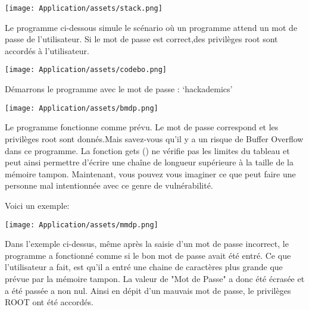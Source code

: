 \begin{center}
\vspace{0.5cm}
\texttt{[image: Application/assets/stack.png]}
\vspace{0.5cm}
\end{center}

Le programme ci-dessous simule le scénario où un programme attend un mot de passe de l'utilisateur. Si le mot de passe est correct,des privilèges root sont accordés à l'utilisateur.

\begin{center}
\vspace{0.5cm}
\texttt{[image: Application/assets/codebo.png]}
\vspace{0.5cm}
\end{center}

Démarrons le programme avec le mot de passe : ‘hackademics'

\begin{center}
\vspace{0.5cm}
\texttt{[image: Application/assets/bmdp.png]}
\vspace{0.5cm}
\end{center}

Le programme fonctionne comme prévu. Le mot de passe correspond et les privilèges root sont donnés.Mais savez-vous qu'il y a un risque de Buffer Overflow dans ce programme. La fonction gets () ne vérifie pas les limites du tableau et peut ainsi permettre d'écrire une chaîne de longueur supérieure à la taille de la mémoire tampon. Maintenant, vous pouvez vous imaginer ce que peut faire une personne mal intentionnée avec ce genre de vulnérabilité.

\vspace{0.5cm}

Voici un exemple:

\begin{center}
\vspace{0.5cm}
\texttt{[image: Application/assets/mmdp.png]}
\vspace{0.5cm}
\end{center}

Dans l'exemple ci-dessus, même après la saisie d'un mot de passe incorrect, le programme a fonctionné comme si le bon mot de passe avait été entré.
Ce que l'utilisateur a fait, est qu'il a entré une chaine de caractères plus grande que prévue par la mémoire tampon. La valeur de "Mot de Passe" a donc été écrasée et a été passée a non nul. Ainsi en dépit d'un mauvais mot de passe, le privilèges ROOT ont été accordés.\newline 

